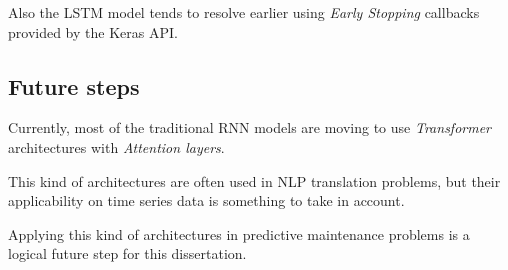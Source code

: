 Also the LSTM model tends to resolve earlier using \textit{Early Stopping} callbacks provided by the Keras API.


\subsection{Future steps}

Currently, most of the traditional RNN models are moving to use \textit{Transformer} architectures with \textit{Attention layers}.

This kind of architectures are often used in NLP translation problems, but their applicability on time series data is something to take in account.

Applying this kind of architectures in predictive maintenance problems is a logical future step for this dissertation.
